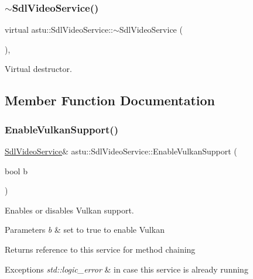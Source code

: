 \subsubsection{\texorpdfstring{$\sim$\+Sdl\+Video\+Service()}{~SdlVideoService()}}
{\footnotesize\ttfamily virtual astu\+::\+Sdl\+Video\+Service\+::$\sim$\+Sdl\+Video\+Service (\begin{DoxyParamCaption}{ }\end{DoxyParamCaption})\hspace{0.3cm}{\ttfamily [inline]}, {\ttfamily [virtual]}}

Virtual destructor. 

\subsection{Member Function Documentation}
\mbox{\label{classastu_1_1SdlVideoService_a1ffb1c36698630d153b50b37cb1bcaee}} 
\subsubsection{\texorpdfstring{Enable\+Vulkan\+Support()}{EnableVulkanSupport()}}
{\footnotesize\ttfamily \hyperlink{classastu_1_1SdlVideoService}{Sdl\+Video\+Service}\& astu\+::\+Sdl\+Video\+Service\+::\+Enable\+Vulkan\+Support (\begin{DoxyParamCaption}\item[{bool}]{b }\end{DoxyParamCaption})}

Enables or disables Vulkan support.


\begin{DoxyParams}{Parameters}
{\em b} & set to {\ttfamily true} to enable Vulkan \\
\hline
\end{DoxyParams}
\begin{DoxyReturn}{Returns}
reference to this service for method chaining 
\end{DoxyReturn}

\begin{DoxyExceptions}{Exceptions}
{\em std\+::logic\+\_\+error} & in case this service is already running \\
\hline
\end{DoxyExceptions}
\mbox{\label{classastu_1_1SdlVideoService_a76d0f56254c9545d4d9762349133d4af}} 
